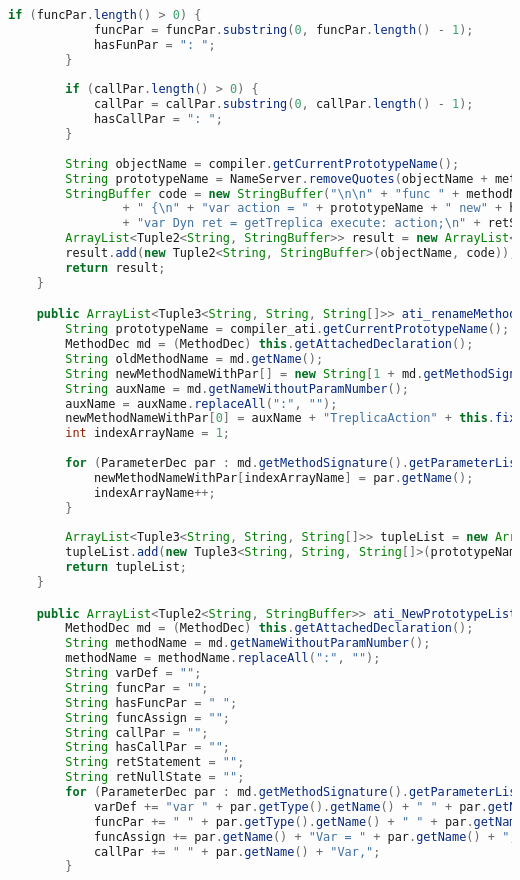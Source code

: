 \begin{lstlisting}[basicstyle=\tiny, language=Java, caption={Código Fonte de \textbf{CyanMetaobjectTreplicaAction}}, label={cod:MetaActionFonte}]
		if (funcPar.length() > 0) {
			funcPar = funcPar.substring(0, funcPar.length() - 1);
			hasFunPar = ": ";
		}
        
		if (callPar.length() > 0) {
			callPar = callPar.substring(0, callPar.length() - 1);
			hasCallPar = ": ";
		}
        
		String objectName = compiler.getCurrentPrototypeName();
		String prototypeName = NameServer.removeQuotes(objectName + methodName);
		StringBuffer code = new StringBuffer("\n\n" + "func " + methodName + hasFunPar + funcPar + hasCallRet + funcRet
				+ " {\n" + "var action = " + prototypeName + " new" + hasCallPar + callPar + ";\n"
				+ "var Dyn ret = getTreplica execute: action;\n" + retStatement + "}\n");
		ArrayList<Tuple2<String, StringBuffer>> result = new ArrayList<>();
		result.add(new Tuple2<String, StringBuffer>(objectName, code));
		return result;
	}

	public ArrayList<Tuple3<String, String, String[]>> ati_renameMethod(ICompiler_ati compiler_ati) {
		String prototypeName = compiler_ati.getCurrentPrototypeName();
		MethodDec md = (MethodDec) this.getAttachedDeclaration();
		String oldMethodName = md.getName();
		String newMethodNameWithPar[] = new String[1 + md.getMethodSignature().getParameterList().size()];
		String auxName = md.getNameWithoutParamNumber();
		auxName = auxName.replaceAll(":", "");
		newMethodNameWithPar[0] = auxName + "TreplicaAction" + this.fixName;
        int indexArrayName = 1;
        
        for (ParameterDec par : md.getMethodSignature().getParameterList()) {
            newMethodNameWithPar[indexArrayName] = par.getName();
            indexArrayName++;
        }
        
		ArrayList<Tuple3<String, String, String[]>> tupleList = new ArrayList<>();
		tupleList.add(new Tuple3<String, String, String[]>(prototypeName, oldMethodName, newMethodNameWithPar));
		return tupleList;
	}

	public ArrayList<Tuple2<String, StringBuffer>> ati_NewPrototypeList(ICompiler_ati compiler_ati) {
		MethodDec md = (MethodDec) this.getAttachedDeclaration();
		String methodName = md.getNameWithoutParamNumber();
		methodName = methodName.replaceAll(":", "");
		String varDef = "";
		String funcPar = "";
		String hasFuncPar = " ";
		String funcAssign = "";
		String callPar = "";
		String hasCallPar = "";
		String retStatement = "";
		String retNullState = "";
		for (ParameterDec par : md.getMethodSignature().getParameterList()) {
			varDef += "var " + par.getType().getName() + " " + par.getName() + "Var\n";
			funcPar += " " + par.getType().getName() + " " + par.getName() + ",";
			funcAssign += par.getName() + "Var = " + par.getName() + ";\n";
			callPar += " " + par.getName() + "Var,";
		}


\end{lstlisting}
